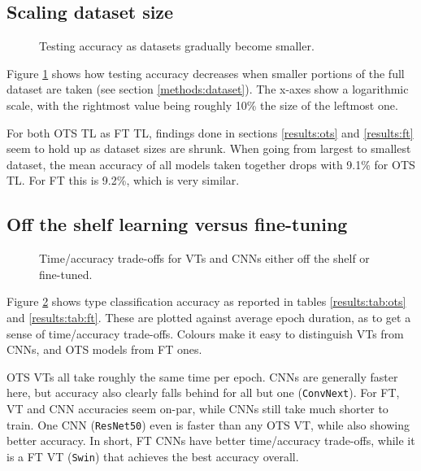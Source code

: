 \subsection{Scaling dataset size}

\begin{figure}[tb]
    \centering
    \def\svgwidth{\textwidth}
    
    \caption{Testing accuracy as datasets gradually become smaller.}
    \label{results:img:scale}
\end{figure}

Figure \ref{results:img:scale} shows how testing accuracy decreases when smaller portions of the full dataset are taken (see section \ref{methods:dataset}). The x-axes show a logarithmic scale, with the rightmost value being roughly 10\% the size of the leftmost one.

For both OTS TL as FT TL, findings done in sections \ref{results:ots} and \ref{results:ft} seem to hold up as dataset sizes are shrunk. When going from largest to smallest dataset, the mean accuracy of all models taken together drops with 9.1\% for OTS TL. For FT this is 9.2\%, which is very similar.

\subsection{Off the shelf learning versus fine-tuning}

\begin{figure}[tbh]
    \centering
    \def\svgwidth{7.7cm}
    
    \caption{Time/accuracy trade-offs for VTs and CNNs either off the shelf or fine-tuned.}
    \label{results:img:ots_vs_ft_type}
\end{figure}


Figure \ref{results:img:ots_vs_ft_type} shows type classification accuracy as reported in tables \ref{results:tab:ots} and \ref{results:tab:ft}. These are plotted against average epoch duration, as to get a sense of time/accuracy trade-offs. Colours make it easy to distinguish VTs from CNNs, and OTS models from FT ones.

OTS VTs all take roughly the same time per epoch. CNNs are generally faster here, but accuracy also clearly falls behind for all but one (\texttt{ConvNext}). For FT, VT and CNN accuracies seem on-par, while CNNs still take much shorter to train. One CNN (\texttt{ResNet50}) even is faster than any OTS VT, while also showing better accuracy. In short, FT CNNs have better time/accuracy trade-offs, while it is a FT VT (\texttt{Swin}) that achieves the best accuracy overall.

